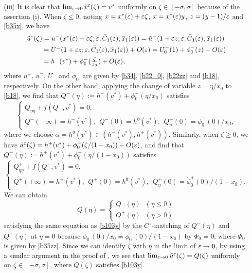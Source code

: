 \documentclass[a4,10pt]{article}
\begin{document}
\no
(iii) 
It is clear that 
$\lim_{\varepsilon \to 0} \tilde{v}^\varepsilon(\zeta) = v^*$
uniformly on $\zeta \in [- \sigma, \sigma]$ because of the assertion (i).
When $\zeta \leq 0$, noting $x = x^*(\varepsilon) + \varepsilon \zeta$, $x= x^*(\varepsilon)y$,
$z = (y-1)/\varepsilon$ and \eqref{b35x}, we have
%
$$
\begin{array}{l}
\tilde{u}^\varepsilon(\zeta)
 =  u^-( x^*(\varepsilon) + \varepsilon \zeta ; \varepsilon, \bar{C}_1(\varepsilon), \bar{x}_1(\varepsilon))
= \tilde{u}^-(1 + \varepsilon z ; \varepsilon; \bar{C}_1(\varepsilon), \bar{x}_1(\varepsilon)) 
\\[1ex]
\ \ \ \ \ \ \ \, =  U^-( 1 + \varepsilon z ; \varepsilon, \bar{C}_1(\varepsilon), \bar{x}_1(\varepsilon)) + O(\varepsilon)
= U_0^-(1) + \phi_0^-(z) + O(\varepsilon) 
\\[1ex]
\ \ \ \ \ \ \ \, =  h^-(v^*) + \phi_0^-(\frac{\zeta}{x_0}) + O(\varepsilon),
\end{array} 
$$ 
%
where $u^-$, $\tilde{u}^-$, $U^-$ and $\phi_0^-$ are given by \eqref{b34}, \eqref{b22_0},
\eqref{b22zz} and \eqref{b18}, respectively. On the other hand, applying the change of 
variable $z = \eta/x_0$ to \eqref{b18}, we find that 
$Q^-(\eta) := h^-(v^*) + \phi_0^-(\eta/x_0)$ satisfies 
%
\[%
\left \{
\begin{array}{l}
Q^-_{\eta \eta} + f( Q^-, v^*) = 0, \\[1ex]
Q^-(- \infty) = h^{-}(v^*), \ \ Q^-(0) = h^0(v^*), \ \ 
Q^-_{\eta}(0) = \dot{\phi}^-_0(0)/x_0, 
\end{array} 
\right.
\]%
%
where we choose $\alpha = h^0(v^*) \in (h^-(v^*), h^+(v^*))$. 
Similarly, when $\zeta \geq 0$, we have 
$\tilde{u}^\varepsilon(\zeta) = h^+(v^*) + \phi_0^+(\zeta/(1-x_0)) + O(\varepsilon)$, and 
find that $Q^+(\eta) := h^+(v^*) + \phi_0^+(\eta/(1-x_0))$
satisfies 
%
\[%
\left \{
\begin{array}{l}
Q^+_{\eta \eta} + f( Q^+, v^*) = 0, \\[1ex]
Q^+(+ \infty) = h^{+}(v^*), \ \ Q^+(0) = h^0(v^*), \ \ 
Q^+_{\eta}(0) = \dot{\phi}^+_0(0)/(1-x_0).
\end{array} 
\right.
\]%
%
We can obtain 
$$
Q(\eta) = 
\left \{
\begin{array}{l}
Q^-(\eta)  \ \ \ (\eta \leq 0) \\[1ex]
Q^+(\eta) \ \ \ (\eta > 0) 
\end{array} 
\right.
$$ 
satisfying the same equation as
\eqref{b103y} by the $C^1$-matching of 
$Q^-(\eta)$ and $Q^+(\eta)$ at $\eta = 0$ because 
$\dot{\phi}^-_0(0)/x_0  = \dot{\phi}^+_0(0) /(1-x_0)$ by $\Phi_0 = 0$, where
$\Phi_0$ is given by \eqref{b35zz}. 
Since we can identify $\zeta$ with $\eta$
in the limit of $\varepsilon \to 0$, by using a similar argument in the proof of \cite[Lemma 1.1]{NF},
we see that 
$\lim_{\varepsilon \to 0} \tilde{u}^\varepsilon(\zeta) = Q(\zeta)$ 
uniformly on $\zeta \in [- \sigma, \sigma]$, where $Q(\zeta)$ satisfies \eqref{b103y}.
\Qed 
\end{document}
